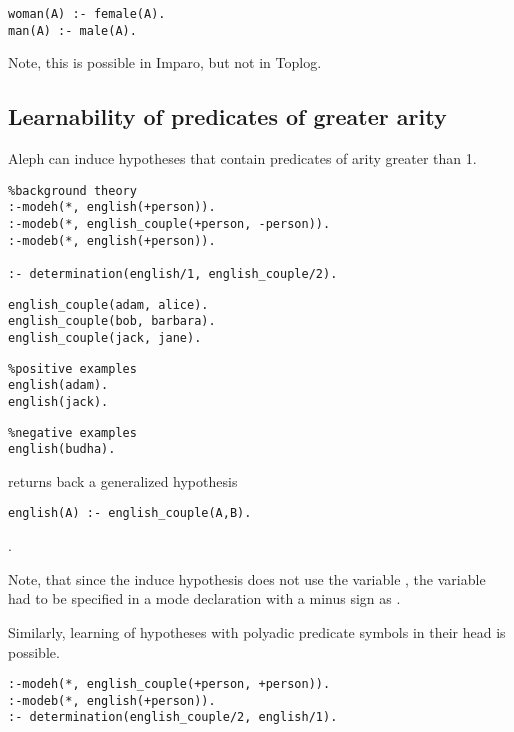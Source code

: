 \begin{lstlisting}
woman(A) :- female(A).
man(A) :- male(A).
\end{lstlisting}

Note, this is possible in Imparo, but not in Toplog.

\subsection{Learnability of predicates of greater arity}
Aleph can induce hypotheses that contain predicates of arity greater than 1.
\begin{lstlisting}
%background theory
:-modeh(*, english(+person)).
:-modeb(*, english_couple(+person, -person)).
:-modeb(*, english(+person)).

:- determination(english/1, english_couple/2).
\end{lstlisting}
\begin{minipage}[t]{.40\textwidth}
\begin{lstlisting}
english_couple(adam, alice).
english_couple(bob, barbara).
english_couple(jack, jane).
\end{lstlisting}
\end{minipage}
\begin{minipage}[t]{.27\textwidth}
\begin{lstlisting}
%positive examples
english(adam).
english(jack).
\end{lstlisting}
\end{minipage}
\begin{minipage}[t]{.25\textwidth}
\begin{lstlisting}
%negative examples
english(budha).
\end{lstlisting}
\end{minipage}

returns back a generalized hypothesis
\begin{lstlisting}
english(A) :- english_couple(A,B).
\end{lstlisting}.

Note, that since the induce hypothesis does not use the variable , the variable had to be specified in a mode declaration with a minus sign as .

Similarly, learning of hypotheses with polyadic predicate symbols in their head is possible.

\begin{lstlisting}
:-modeh(*, english_couple(+person, +person)).
:-modeb(*, english(+person)).
:- determination(english_couple/2, english/1).
\end{lstlisting}

